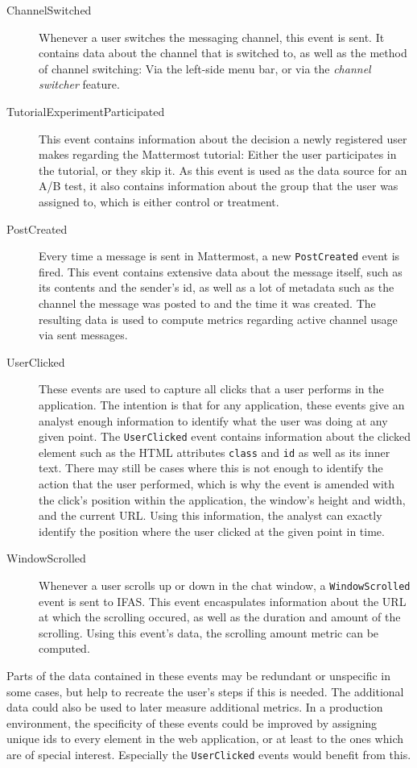 \begin{description}
\item[ChannelSwitched]
Whenever a user switches the messaging channel, this event is sent.
It contains data about the channel that is switched to, as well as the method of channel switching: Via the left-side menu bar, or via the \emph{channel switcher} feature.
\item[TutorialExperimentParticipated]
This event contains information about the decision a newly registered user makes regarding the Mattermost tutorial:
Either the user participates in the tutorial, or they skip it.
As this event is used as the data source for an A/B test, it also contains information about the group that the user was assigned to, which is either control or treatment.
\item[PostCreated]
Every time a message is sent in Mattermost, a new \texttt{PostCreated} event is fired.
This event contains extensive data about the message itself, such as its contents and the sender's id, as well as a lot of metadata such as the channel the message was posted to and the time it was created.
The resulting data is used to compute metrics regarding active channel usage via sent messages.
\item[UserClicked]
These events are used to capture all clicks that a user performs in the application.
The intention is that for any application, these events give an analyst enough information to identify what the user was doing at any given point.
The \texttt{UserClicked} event contains information about the clicked element such as the HTML attributes \texttt{class} and \texttt{id} as well as its inner text.
There may still be cases where this is not enough to identify the action that the user performed, which is why the event is amended with the click's position within the application, the window's height and width, and the current URL.
Using this information, the analyst can exactly identify the position where the user clicked at the given point in time.
\item[WindowScrolled]
Whenever a user scrolls up or down in the chat window, a \texttt{WindowScrolled} event is sent to \ac{IFAS}.
This event encaspulates information about the URL at which the scrolling occured, as well as the duration and amount of the scrolling.
Using this event's data, the scrolling amount metric can be computed.
\end{description}

Parts of the data contained in these events may be redundant or unspecific in some cases, but help to recreate the user's steps if this is needed.
The additional data could also be used to later measure additional metrics.
In a production environment, the specificity of these events could be improved by assigning unique ids to every element in the web application, or at least to the ones which are of special interest.
Especially the \texttt{UserClicked} events would benefit from this.

